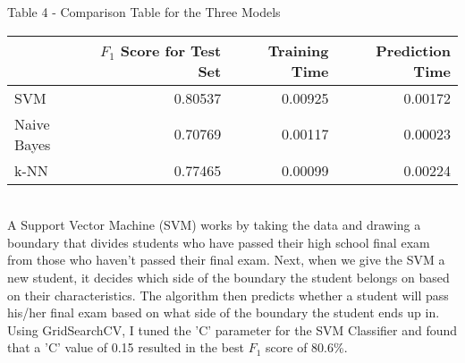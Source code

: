 \documentclass[11pt]{article}
\begin{document}
\begin{center} Table 4 - Comparison Table for the Three Models
\end{center}
\begin{tabular}{ l r r r }
  \hline
  & $F_1$ Score for Test Set & Training Time & Prediction Time \\
  \hline
  SVM & 0.80537 & 0.00925 & 0.00172 \\
  Naive Bayes & 0.70769 & 0.00117 & 0.00023 \\
  k-NN & 0.77465 & 0.00099 & 0.00224 \\

\end{tabular}
 \\
 
A Support Vector Machine (SVM) works by taking the data and drawing a boundary that divides students who have passed their high school final exam from those who haven't passed their final exam. Next, when we give the SVM a new student, it decides which side of the boundary the student belongs on based on their characteristics. The algorithm then predicts whether a student will pass his/her final exam based on what side of the boundary the student ends up in.\\

Using GridSearchCV, I tuned the 'C' parameter for the SVM Classifier and found that a 'C' value of 0.15 resulted in the best $F_1$ score of 80.6\%. 
\end{document}

